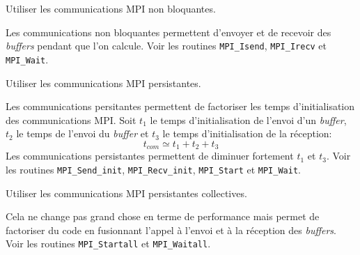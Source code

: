 \begin{questions}
	\question Utiliser les communications MPI non bloquantes.
	\begin{solution}
		Les communications non bloquantes permettent d'envoyer et de recevoir des \textit{buffers} pendant que l'on calcule.
		Voir les routines \texttt{MPI\_Isend}, \texttt{MPI\_Irecv} et \texttt{MPI\_Wait}.
	\end{solution}

	\question Utiliser les communications MPI persistantes.
	\begin{solution}
		Les communications persitantes permettent de factoriser les temps d'initialisation des communications MPI.
		Soit $t_1$ le temps d'initialisation de l'envoi d'un \textit{buffer}, $t_2$ le temps de l'envoi du \textit{buffer} et $t_3$ le temps d'initialisation de la réception:
		\begin{equation*}
			t_{com} \simeq t_1 + t_2 + t_3
		\end{equation*}
		Les communications persistantes permettent de diminuer fortement $t_1$ et $t_3$.
		Voir les routines \texttt{MPI\_Send\_init}, \texttt{MPI\_Recv\_init}, \texttt{MPI\_Start} et \texttt{MPI\_Wait}.
	\end{solution}

	\question Utiliser les communications MPI persistantes collectives.
	\begin{solution}
		Cela ne change pas grand chose en terme de performance mais permet de factoriser du code en fusionnant l'appel à l'envoi et à la réception des \textit{buffers}.
		Voir les routines \texttt{MPI\_Startall} et \texttt{MPI\_Waitall}.
	\end{solution}


\end{questions}
